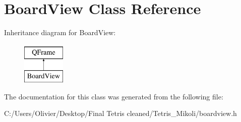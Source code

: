 \section{Board\+View Class Reference}
\label{class_board_view}
Inheritance diagram for Board\+View\+:\begin{figure}[H]
\begin{center}
\leavevmode
\includegraphics[height=2.000000cm]{class_board_view}
\end{center}
\end{figure}


The documentation for this class was generated from the following file\+:\begin{DoxyCompactItemize}
\item 
C\+:/\+Users/\+Olivier/\+Desktop/\+Final Tetris cleaned/\+Tetris\+\_\+\+Mikoli/boardview.\+h\end{DoxyCompactItemize}
